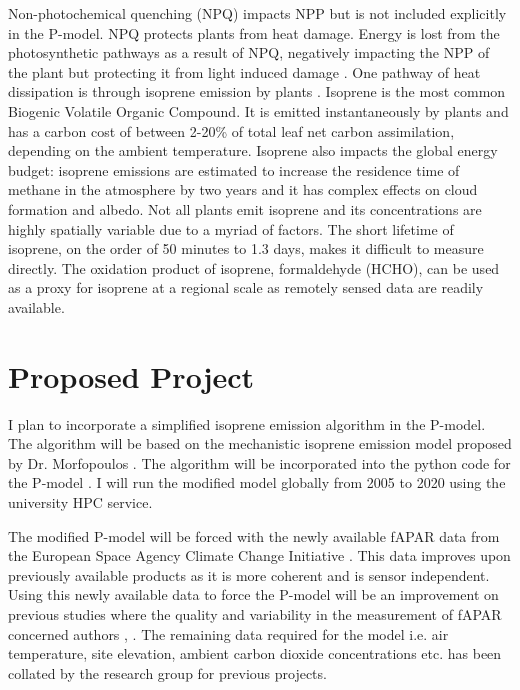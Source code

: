 \documentclass[11pt] {article}
\begin{document}
    \vskip 0.2in

    \noindent Non-photochemical quenching (NPQ) impacts NPP but is not included explicitly in the P-model.  NPQ protects plants from heat damage. Energy is lost from the photosynthetic pathways as a result of NPQ, negatively impacting the NPP of the plant but protecting it from light induced damage \citep{NPQ_Evolution}. One pathway of heat dissipation is through isoprene emission by plants \citep{morfopoulos_prentice_2014}. Isoprene is the most common Biogenic Volatile Organic Compound. It is emitted instantaneously by plants and has a carbon cost of between 2-20\% of total leaf net carbon assimilation, depending on the ambient temperature. Isoprene also impacts the global energy budget: isoprene emissions are estimated to increase the residence time of methane in the atmosphere by two years and it has complex effects on cloud formation and albedo. Not all plants emit isoprene and its concentrations are highly spatially variable due to a myriad of factors. The short lifetime of isoprene, on the order of 50 minutes to 1.3 days, makes it difficult to measure directly. The oxidation product of isoprene, formaldehyde (HCHO), can be used as a proxy for isoprene at a regional scale as remotely sensed data are readily available.
    
    \section{Proposed Project}
    I plan to incorporate a simplified isoprene emission algorithm in the P-model. The algorithm will be based on the mechanistic isoprene emission model proposed by Dr. Morfopoulos \citep{morfopoulos_prentice_2014}. The algorithm will be incorporated into the python code for the P-model \citep{P-Modelv1.0}. I will run the modified model globally from 2005 to 2020 using the university HPC service. 
   
    \vskip 0.2in
    
    \noindent The modified P-model will be forced with the newly available fAPAR data from the European Space Agency Climate Change Initiative \citep{blessing_2022}. This data improves upon previously available products as it is more coherent and is sensor independent. Using this newly available data to force the P-model will be an improvement on previous studies where the quality and variability in the measurement of fAPAR concerned authors \citep{P-Modelv1.0}, \citep{acclimation_2021}. The remaining data required for the model i.e. air temperature, site elevation, ambient carbon dioxide concentrations etc. has been collated by the research group for previous projects. 
\end{document}
